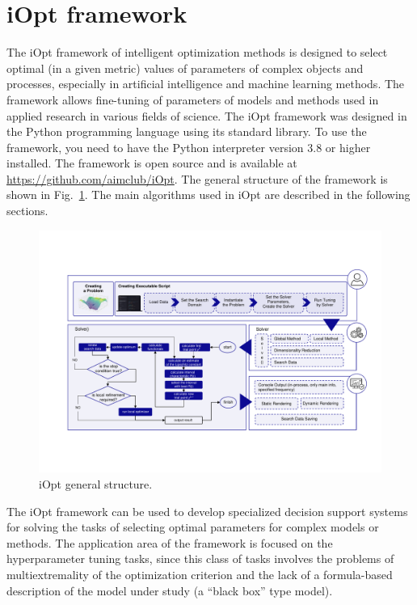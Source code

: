 \documentclass[preprint,12pt]{elsarticle}
\begin{document}
\section{iOpt framework} 
\label{sec_iOpt}

The iOpt framework of intelligent optimization methods is designed to select optimal (in a given metric) values of parameters of complex objects and processes, especially in artificial intelligence and machine learning methods. The framework allows fine-tuning of parameters of models and methods used in applied research in various fields of science.  The iOpt framework was designed in the Python programming language using its standard library. To use the framework, you need to have the Python interpreter version 3.8 or higher installed. The framework is open source and is available at \url{https://github.com/aimclub/iOpt}.
The general structure of the framework is shown in Fig.~\ref{fig_iOpt}. The main algorithms used in iOpt are described in the following sections.

\begin{figure}[t]
\centering
\includegraphics[width=1.0\textwidth]{scheme.pdf}
\caption{iOpt general structure.} \label{fig_iOpt}
\end{figure}


The iOpt framework can be used to develop specialized decision support systems for solving the tasks of selecting optimal parameters for complex models or methods. The application area of the framework is focused on the hyperparameter tuning tasks, since this class of tasks involves the problems of multiextremality of the optimization criterion and the lack of a formula-based description of the model under study (a ``black box'' type model).
\end{document}
